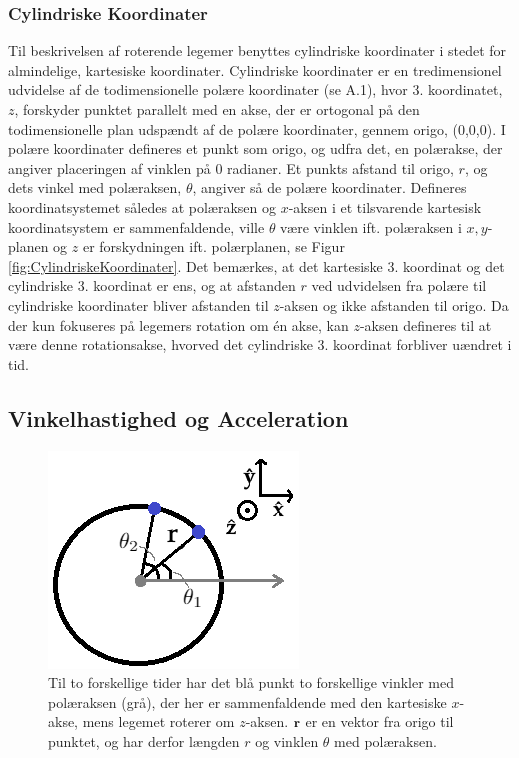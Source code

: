 \subsubsection{Cylindriske Koordinater}
Til beskrivelsen af roterende legemer benyttes cylindriske koordinater i stedet for almindelige, kartesiske koordinater. Cylindriske koordinater er en tredimensionel udvidelse af de todimensionelle polære koordinater (se A.1), hvor 3. koordinatet, $z$, forskyder punktet parallelt med en akse, der er ortogonal på den todimensionelle plan udspændt af de polære koordinater, gennem origo, (0,0,0). I polære koordinater defineres et punkt  som origo, og udfra det, en polærakse, der angiver placeringen af vinklen på 0 radianer. Et punkts afstand til origo, $r$, og dets vinkel med polæraksen, $\theta$, angiver så de polære koordinater. Defineres koordinatsystemet således at polæraksen og $x$-aksen i et tilsvarende kartesisk koordinatsystem er sammenfaldende, ville $\theta$ være vinklen ift. polæraksen i $x,y$-planen og $z$ er forskydningen ift. polærplanen, se Figur \ref{fig:CylindriskeKoordinater}. Det bemærkes, at det kartesiske 3. koordinat og det cylindriske 3. koordinat er ens, og at afstanden $r$ ved udvidelsen fra polære til cylindriske koordinater bliver afstanden til $z$-aksen og ikke afstanden til origo. Da der kun fokuseres på legemers rotation om én akse, kan $z$-aksen defineres til at være denne rotationsakse, hvorved det cylindriske 3. koordinat forbliver uændret i tid.

\subsection{Vinkelhastighed og Acceleration}
\begin{figure}[h!]
\centering
\includegraphics[width=.3\textwidth]{RotationelMekanik/Roterende-Legeme}
\caption{ Til to forskellige tider har det blå punkt to forskellige vinkler med polæraksen (grå), der her er sammenfaldende med den kartesiske $x$-akse, mens legemet roterer om $z$-aksen. $\mathbf{r}$ er en vektor fra origo til punktet, og har derfor længden $r$ og vinklen $\theta$ med polæraksen.}
\label{fig:Roterende-Legeme}
\end{figure}

